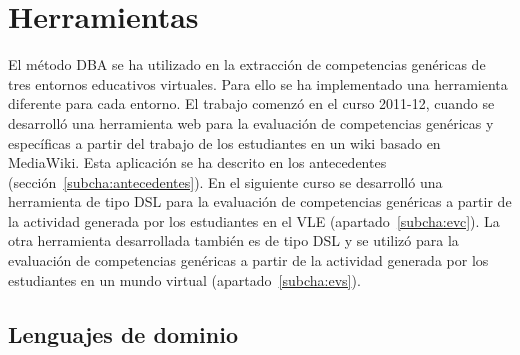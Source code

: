 \section{Herramientas}

	El método DBA se ha utilizado en la extracción de competencias genéricas de tres entornos educativos virtuales. Para ello se ha implementado una herramienta diferente para cada entorno. El trabajo comenzó en el curso 2011-12, cuando se desarrolló una herramienta web para la evaluación de competencias genéricas y específicas a partir del trabajo de los estudiantes en un wiki basado en MediaWiki. Esta aplicación se ha descrito en los  antecedentes (sección~\ref{subcha:antecedentes}). En el siguiente curso se desarrolló una herramienta de tipo DSL para la evaluación de competencias genéricas a partir de la actividad generada por los estudiantes en el VLE (apartado~\ref{subcha:evc}). La otra herramienta desarrollada también es de tipo DSL y se utilizó para la evaluación de competencias genéricas a partir de la actividad generada por los estudiantes en un mundo virtual (apartado~\ref{subcha:evs}).


	\subsection{Lenguajes de dominio}



